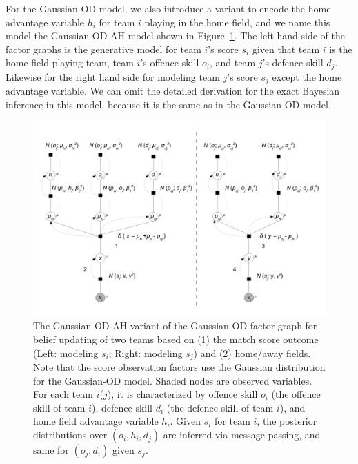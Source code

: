 For the Gaussian-OD model, we also introduce a variant to encode the home advantage variable $h_i$ for team $i$ playing in the home field, and we name this model the Gaussian-OD-AH model shown in Figure~\ref{fig:GaussianODHA}. The left hand side of the factor graphs is the generative model for team $i$'s score $s_i$ given that team $i$ is the home-field playing team, team $i$'s offence skill $o_i$, and team $j$'s defence skill $d_j$. Likewise for the right hand side for modeling team $j$'s score $s_j$ except the home advantage variable. We can omit the detailed derivation for the exact Bayesian inference in this model, because it is the same as in the Gaussian-OD model. 
\begin{figure}[t!]
\centerline{\includegraphics[scale=0.3]{modelAndInferenceGaussianGraphicalModelHA}}
\caption{
The Gaussian-OD-AH variant of the Gaussian-OD factor graph for belief updating of two teams based on (1) the match score outcome (Left: modeling $s_i$; Right: modeling $s_j$) and (2) home/away fields. Note that the score observation factors use the Gaussian distribution for the Gaussian-OD model. Shaded nodes are observed variables. For each team $i$($j$), it is characterized by offence skill $o_{i}$ (the offence skill of team $i$), defence skill $d_{i}$ (the defence skill of team $i$), and home field advantage variable $h_i$. Given $s_i$ for team $i$, the posterior distributions over $(o_i, h_i, d_j)$ are inferred via message passing, and same for $(o_j, d_i)$ given $s_j$.}
\label{fig:GaussianODHA}
\end{figure}


